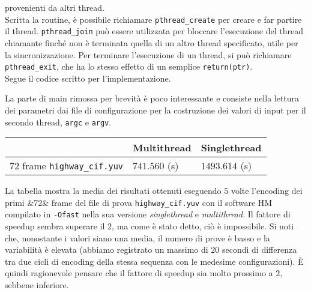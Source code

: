 provenienti da altri thread. \\
Scritta la routine, è possibile richiamare \verb|pthread_create| per creare e 
far partire il thread. \verb|pthread_join| può essere utilizzata per bloccare 
l'esecuzione del thread chiamante finché non è terminata quella di un altro 
thread specificato, utile per la sincronizzazione. Per terminare l'esecuzione 
di un thread, si può richiamare \verb|pthread_exit|, che ha lo stesso effetto 
di un semplice \verb|return(ptr)|.\\
Segue il codice scritto per l'implementazione.\\[8pt]
\begin{center}

\end{center}
La parte di main rimossa per brevità è poco interessante e consiste nella 
lettura dei parametri dai file di configurazione per la costruzione dei valori 
di input per il secondo thread, \verb|argc| e \verb|argv|.
\begin{center}
	\begin{tabular}{l | l | l}
		& Multithread & Singlethread \\
		\hline
		$72$ frame \verb|highway_cif.yuv| & $741.560$ (s) & $1493.614$ (s)
	\end{tabular}
\end{center}
La tabella mostra la media dei risultati ottenuti eseguendo $5$ volte 
l'encoding dei primi &72& frame del file di prova \verb|highway_cif.yuv| con il 
software HM compilato in \verb|-Ofast| nella sua versione \emph{singlethread} e 
\emph{multithread}. Il fattore di speedup sembra superare il $2$, ma come è 
stato detto, ciò è impossibile. Si noti che, nonostante i valori siano una 
media, il numero di prove è basso e la variabilità è elevata (abbiamo 
registrato un massimo di $20$ secondi di differenza tra due cicli di encoding 
della stessa sequenza con le medesime configurazioni). \`E quindi ragionevole 
pensare che il fattore di speedup sia molto prossimo a $2$, sebbene inferiore.
